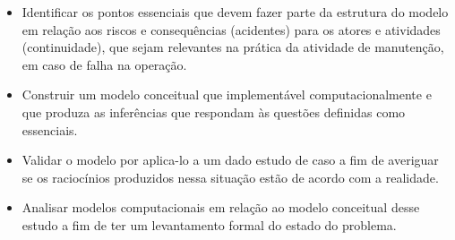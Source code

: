 \begin{itemize}
    \item Identificar os pontos essenciais que devem fazer parte da estrutura do modelo em relação aos riscos e consequências (acidentes) para os atores e atividades (continuidade), que sejam relevantes na prática da atividade de manutenção, em caso de falha na operação. 
    \item Construir um modelo conceitual que implementável computacionalmente e que produza as inferências que respondam às questões definidas como essenciais.
    \item Validar o modelo por aplica-lo a um dado estudo de caso a fim de averiguar se os raciocínios produzidos nessa situação estão de acordo com a realidade.  
    \item Analisar modelos computacionais em relação ao modelo conceitual desse estudo a fim de ter um levantamento formal do estado do problema.
\end{itemize}